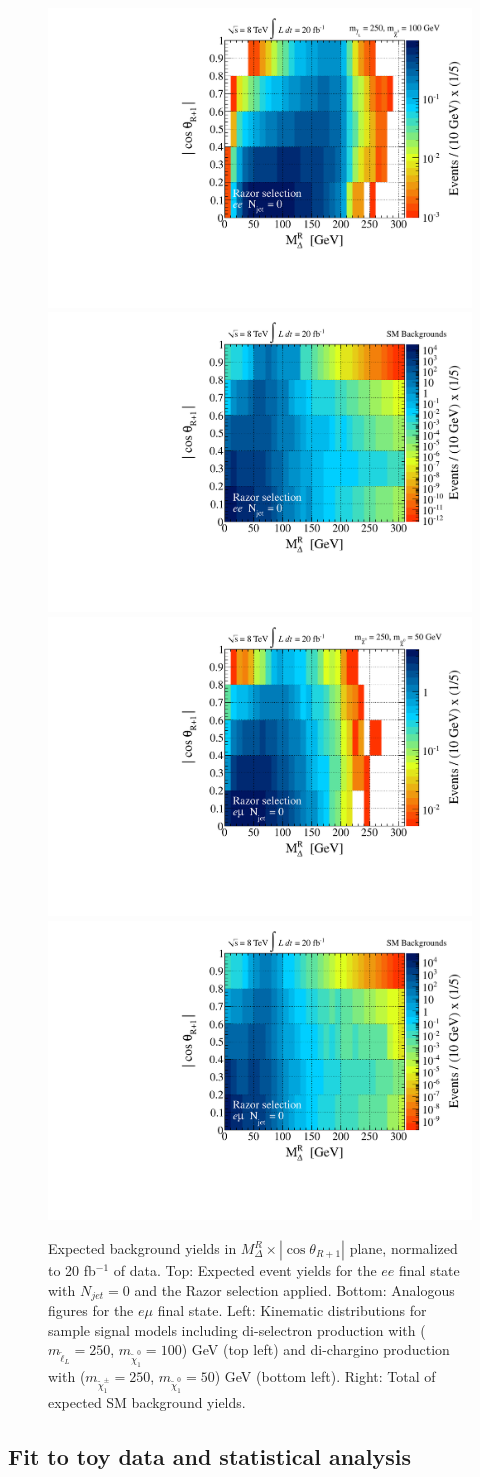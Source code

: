 \begin{figure}[ht]
\includegraphics[width=0.35\columnwidth]{fig/sectionIV/PDF_2D_ee_selectron.pdf}
\includegraphics[width=0.35\columnwidth]{fig/sectionIV/PDF_2D_ee_BKG.pdf}
\includegraphics[width=0.35\columnwidth]{fig/sectionIV/PDF_2D_emu_chargino.pdf}
\includegraphics[width=0.35\columnwidth]{fig/sectionIV/PDF_2D_emu_BKG.pdf}
\caption{Expected background yields in $M_{\Delta}^{R} \times |\cos\theta_{R+1}|$ plane, normalized to 20 fb$^{-1}$ of data. Top: Expected event yields for the $ee$ final state with $N_{jet} = 0$ and the Razor selection applied. Bottom: Analogous figures for the $e\mu$ final state. Left: Kinematic distributions for sample signal models including di-selectron production with ($m_{\tilde{\ell}_L}=250$, $m_{\tilde{\chi}^{0}_{1}}=100$) GeV (top left) and di-chargino production with ($m_{\tilde{\chi}^{\pm}_1}=250$, $m_{\tilde{\chi}^{0}_{1}}=50$)  GeV (bottom left). Right: Total of expected SM background yields. \label{fig:COSTHETAPDF}}
\end{figure}

\subsection{Fit to toy data and statistical analysis}

